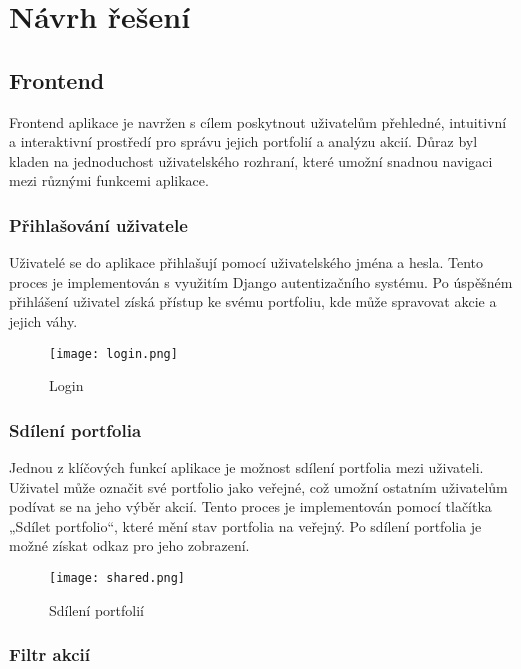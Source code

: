 \documentclass[12pt, a4paper]{report}
\begin{document}
\chapter{Návrh řešení}

\section{Frontend}

Frontend aplikace je navržen s cílem poskytnout uživatelům přehledné, intuitivní a interaktivní prostředí pro správu jejich portfolií a analýzu akcií. Důraz byl kladen na jednoduchost uživatelského rozhraní, které umožní snadnou navigaci mezi různými funkcemi aplikace.

\subsection{Přihlašování uživatele}

Uživatelé se do aplikace přihlašují pomocí uživatelského jména a hesla. Tento proces je implementován s využitím Django autentizačního systému. Po úspěšném přihlášení uživatel získá přístup ke svému portfoliu, kde může spravovat akcie a jejich váhy.

\begin{figure}[h]
	\centering
	\texttt{[image: login.png]}
    \caption{Login}
\end{figure}

\subsection{Sdílení portfolia}

Jednou z klíčových funkcí aplikace je možnost sdílení portfolia mezi uživateli. Uživatel může označit své portfolio jako veřejné, což umožní ostatním uživatelům podívat se na jeho výběr akcií. Tento proces je implementován pomocí tlačítka „Sdílet portfolio“, které mění stav portfolia na veřejný. Po sdílení portfolia je možné získat odkaz pro jeho zobrazení.

\begin{figure}[h]
	\centering
	\texttt{[image: shared.png]}
    \caption{Sdílení portfolií}
\end{figure}

\subsection{Filtr akcií}
\end{document}
